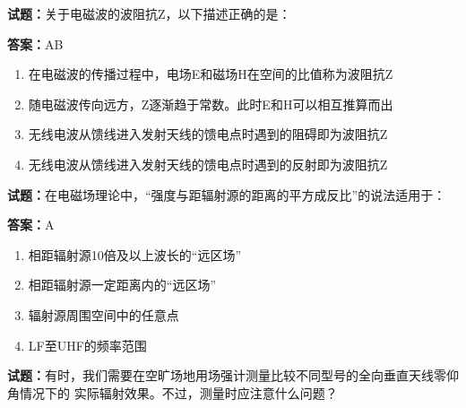 \documentclass{ctexbook}
\begin{document}




\vspace{1em}

\textbf{试题：}关于电磁波的波阻抗Z，以下描述正确的是： 

\textbf{答案：}AB 

\begin{enumerate}[leftmargin=3em]
  \item 在电磁波的传播过程中，电场E和磁场H在空间的比值称为波阻抗Z 

  \item 随电磁波传向远方，Z逐渐趋于常数。此时E和H可以相互推算而出 

  \item 无线电波从馈线进入发射天线的馈电点时遇到的阻碍即为波阻抗Z 

  \item 无线电波从馈线进入发射天线的馈电点时遇到的反射即为波阻抗Z 

\end{enumerate}





\vspace{1em}

\textbf{试题：}在电磁场理论中，“强度与距辐射源的距离的平方成反比”的说法适用于： 

\textbf{答案：}A 

\begin{enumerate}[leftmargin=3em]
  \item 相距辐射源10倍及以上波长的“远区场” 

  \item 相距辐射源一定距离内的“远区场” 

  \item 辐射源周围空间中的任意点 

  \item LF至UHF的频率范围 

\end{enumerate}





\vspace{1em}

\textbf{试题：}有时，我们需要在空旷场地用场强计测量比较不同型号的全向垂直天线零仰角情况下的
实际辐射效果。不过，测量时应注意什么问题？ 
\end{document}
